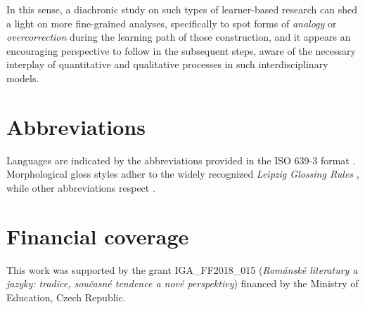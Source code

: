 \documentclass[
  a4paper,
  twoside,
  12pt,
  chapterprefix=false,
  listof=flat]{scrartcl}
\theoremstyle{plain} %
\theoremstyle{definition}
\theoremstyle{remark}
\begin{document}
In this sense, a diachronic study on such types of learner-based research can shed a light on more fine-grained analyses, specifically to spot forms of \emph{analogy} or \emph{overcorrection} during the learning path of those construction, and it appears an encouraging perspective to follow in the subsequent steps, aware of the necessary interplay of quantitative and qualitative processes in such interdisciplinary models.

\hypertarget{abbreviations}{%
\section*{Abbreviations}\label{abbreviations}}

Languages are indicated by the abbreviations provided in the ISO 639-3 format \citep{iso639-3}. Morphological gloss styles adher to the widely recognized \emph{Leipzig Glossing Rules} \citep{leipzigGlossingRules}, while other abbreviations respect \citep{boeckxListOfAbbreviations}.

\hypertarget{financial-coverage}{%
\section*{Financial coverage}\label{financial-coverage}}

This work was supported by the grant IGA\_FF2018\_015 (\emph{Románské literatury a jazyky: tradice, současné tendence a nové perspektivy}) financed by the Ministry of Education, Czech Republic.

  
\end{document}
